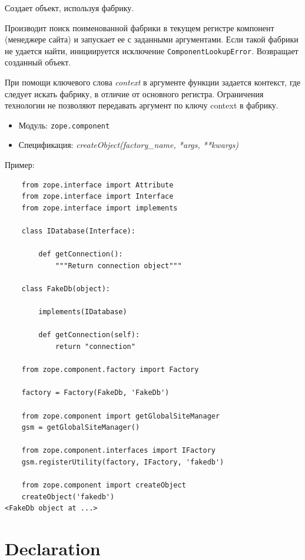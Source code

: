 \documentclass[a4paper,openany,twoside,draft]{book}
\providecommand*{\DUroletitlereference}[1]{\textsl{#1}}
\begin{document}
Создает объект, используя фабрику.

Производит поиск поименованной фабрики в текущем регистре компонент (менеджере сайта) и запускает ее с заданными аргументами.  Если такой фабрики не удается найти, инициируется исключение \texttt{ComponentLookupError}.  Возвращает созданный объект.

При помощи ключевого слова \DUroletitlereference{context} в аргументе функции задается контекст, где следует искать фабрику, в отличие от основного регистра.  Ограничения технологии не позволяют передавать аргумент по ключу \textquotedbl{}context\textquotedbl{} в фабрику.

\begin{itemize}

\item Модуль: \texttt{zope.component}

\item Спецификация: \DUroletitlereference{createObject(factory\_name, *args, **kwargs)}

\end{itemize}

Пример:

\begin{verbatim}
    from zope.interface import Attribute
    from zope.interface import Interface
    from zope.interface import implements

    class IDatabase(Interface):

        def getConnection():
            """Return connection object"""

    class FakeDb(object):

        implements(IDatabase)

        def getConnection(self):
            return "connection"

    from zope.component.factory import Factory

    factory = Factory(FakeDb, 'FakeDb')

    from zope.component import getGlobalSiteManager
    gsm = getGlobalSiteManager()

    from zope.component.interfaces import IFactory
    gsm.registerUtility(factory, IFactory, 'fakedb')

    from zope.component import createObject
    createObject('fakedb')
<FakeDb object at ...>
\end{verbatim}


\section*{Declaration%
  \label{declaration}%
}
\end{document}
